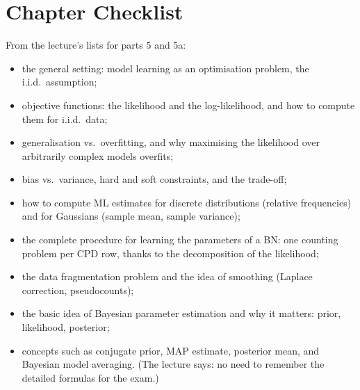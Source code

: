 \documentclass[11pt, oneside]{book}
\newcommand{\planned}[1]{%
  \par{\small\color{gray!70!black}\textit{Planned content:} #1}\par}
\let\originalsection\section
\renewcommand{\section}{\Needspace{7\baselineskip}\originalsection}
\begin{document}
\section{Chapter Checklist}

From the lecture's lists for parts 5 and 5a:
\begin{itemize}
  \item the general setting: model learning as an optimisation problem, the
    i.i.d.\ assumption;
  \item objective functions: the likelihood and the log-likelihood, and how to
    compute them for i.i.d.\ data;
  \item generalisation vs.\ overfitting, and why maximising the likelihood over
    arbitrarily complex models overfits;
  \item bias vs.\ variance, hard and soft constraints, and the trade-off;
  \item how to compute ML estimates for discrete distributions (relative
    frequencies) and for Gaussians (sample mean, sample variance);
  \item the complete procedure for learning the parameters of a BN: one
    counting problem per CPD row, thanks to the decomposition of the likelihood;
  \item the data fragmentation problem and the idea of smoothing (Laplace
    correction, pseudocounts);
  \item the basic idea of Bayesian parameter estimation and why it matters:
    prior, likelihood, posterior;
  \item concepts such as conjugate prior, MAP estimate, posterior mean, and
    Bayesian model averaging. (The lecture says: no need to remember the
    detailed formulas for the exam.)
\end{itemize}



\end{document}
